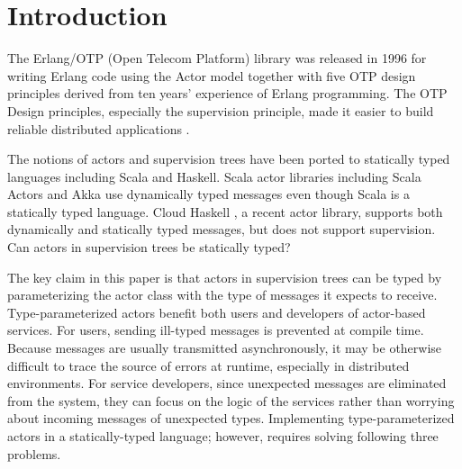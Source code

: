 \section{Introduction}

The Erlang/OTP (Open Telecom Platform) library \cite{ErlangWeb}
was released in 1996 for writing Erlang code using the Actor
model \cite{Hewitt:1973} together with five OTP design principles derived from
ten years' experience of Erlang programming. The OTP Design principles, 
especially the supervision principle, made it easier to build reliable 
distributed applications \cite{ArmstrongErlang}.

The notions of actors and supervision trees have been ported to statically 
typed languages including Scala and Haskell.  Scala actor libraries including 
Scala Actors \cite{actor_1, actor_2} and Akka \cite{akka_api,akka_doc} use 
dynamically typed messages even though Scala is a statically typed language.  
Cloud Haskell \cite{CloudHaskell}, a recent actor library, supports both 
dynamically and statically typed messages, but does not support supervision. 
Can actors in supervision trees be statically typed?

The key claim in this paper is that actors in supervision trees can be
typed by parameterizing the actor class with the type of messages it expects to
receive.  Type-parameterized actors benefit both users and developers
of actor-based services. For users, sending ill-typed messages is prevented at 
compile time.  Because messages are usually transmitted asynchronously, it may 
be otherwise difficult to trace the source of errors at runtime, especially in 
distributed environments.  For service developers, since unexpected messages 
are eliminated from the system, they can focus on the logic of the services 
rather than worrying about incoming messages of unexpected types.  Implementing 
type-parameterized actors in a statically-typed language; however, requires 
solving following three problems.

